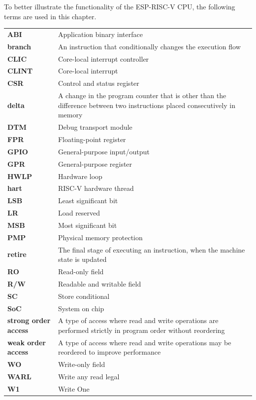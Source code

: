 \documentclass[main\_\_EN.tex]{subfiles}
\begin{document}
To better illustrate the functionality of the ESP-RISC-V CPU, the following terms are used in this chapter.

\begin{longtable}[c]{ R{2cm} p{12cm} }
\textbf{ABI} & Application binary interface\\
\textbf{branch} & An instruction that conditionally changes the execution flow \\
\textbf{CLIC} & Core-local interrupt controller\\
\textbf{CLINT} & Core-local interrupt\\
\textbf{CSR} & Control and status register\\
\textbf{delta} & A change in the program counter that is other than the difference between two instructions placed consecutively in memory \\
\textbf{DTM} & Debug transport module \\
\textbf{FPR} & Floating-point register\\
\textbf{GPIO} & General-purpose input/output\\
\textbf{GPR} & General-purpose register\\
\textbf{HWLP} & Hardware loop\\
\textbf{hart} & RISC-V hardware thread \\
\textbf{LSB} & Least significant bit\\
\textbf{LR} & Load reserved\\
\textbf{MSB} & Most significant bit\\
\textbf{PMP} & Physical memory protection\\
\textbf{retire} & The final stage of executing an instruction, when the machine state is updated \\
\textbf{RO} & Read-only field\\
\textbf{R/W} & Readable and writable field\\
\textbf{SC} & Store conditional\\
\textbf{SoC} & System on chip\\
\textbf{strong order access} & A type of access where read and write operations are performed strictly in program order without reordering \\
\textbf{weak order access} & A type of access where read and write operations may be reordered to improve performance \\
\textbf{WO} & Write-only field\\
\textbf{WARL} & Write any read legal\\
\textbf{W1} & Write One\\
\end{longtable}
\end{document}

